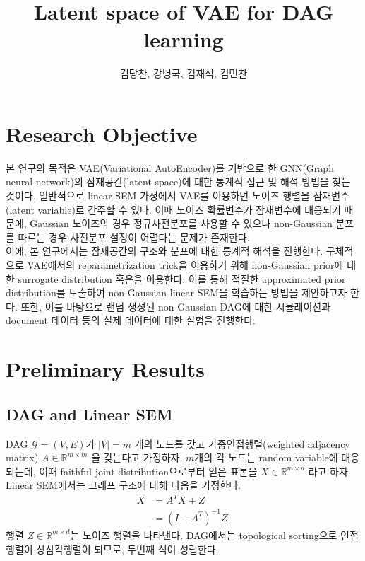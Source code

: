 \documentclass[10pt]{article}
\title{\textbf{Latent space of VAE for DAG learning}}
\author{김당찬, 강병국, 김재석, 김민찬}
\begin{document}
\maketitle

\section{Research Objective}

본 연구의 목적은 VAE(Variational AutoEncoder)를 기반으로 한 GNN(Graph neural network)의 잠재공간(latent space)에 대한 통계적 접근 및 해석 방법을 찾는 것이다. 일반적으로 linear SEM 가정에서 VAE를 이용하면 노이즈 행렬을 잠재변수(latent variable)로 간주할 수 있다. 이때 노이즈 확률변수가 잠재변수에 대응되기 때문에, Gaussian 노이즈의 경우 정규사전분포를 사용할 수 있으나 non-Gaussian 분포를 따르는 경우 사전분포 설정이 어렵다는 문제가 존재한다. \\ 

이에, 본 연구에서는 잠재공간의 구조와 분포에 대한 통계적 해석을 진행한다. 구체적으로 VAE에서의 reparametrization trick을 이용하기 위해 non-Gaussian prior에 대한 surrogate distribution 혹은을 이용한다. 이를 통해 적절한 approximated prior distribution를 도출하여 non-Gaussian linear SEM을 학습하는 방법을 제안하고자 한다. 또한, 이를 바탕으로 랜덤 생성된 non-Gaussian DAG에 대한 시뮬레이션과 document 데이터 등의 실제 데이터에 대한 실험을 진행한다.

\section{Preliminary Results}

\subsection{DAG and Linear SEM}

DAG $\mathcal{G}=(V,E)$가 $|V|=m$ 개의 노드를 갖고 가중인접행렬(weighted adjacency matrix) $A\in\mathbb R^{m\times m}$ 을 갖는다고 가정하자. $m$개의 각 노드는 random variable에 대응되는데, 이때 faithful joint distribution으로부터 얻은 표본을 $X\in\mathbb R^{m\times d}$ 라고 하자. Linear SEM에서는 그래프 구조에 대해 다음을 가정한다.
\begin{align}
    X &= A^TX+Z \\
    &= (I-A^T)^{-1}Z. \label{linearSEM}
\end{align}
행렬 $Z\in\mathbb R^{m\times d}$는 노이즈 행렬을 나타낸다. DAG에서는 topological sorting으로 인접행렬이 상삼각행렬이 되므로, 두번째 식이 성립한다. \\
\end{document}
